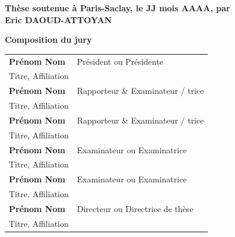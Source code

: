\documentclass[12pt, a4paper]{book}
\begin{document}
\begin{titlepage}
\textbf{Thèse soutenue à Paris-Saclay, le JJ mois AAAA, par}\\
\bigskip
\Large {\color{Prune} \textbf{Eric DAOUD-ATTOYAN}} %

\vspace{\fill} %

\bigskip

\flushleft
\small \textbf{Composition du jury}\\
\vspace{2mm}
\scriptsize
\begin{tabular}{|p{7cm}l}
\arrayrulecolor{Prune}
\textbf{Prénom Nom} &   Président ou Présidente\\
Titre, Affiliation & \\
\textbf{Prénom Nom} &  Rapporteur \& Examinateur / trice \\
Titre, Affiliation   &   \\
\textbf{Prénom Nom} &  Rapporteur \& Examinateur / trice \\
Titre, Affiliation  &   \\
\textbf{Prénom Nom} &  Examinateur ou Examinatrice \\
Titre, Affiliation   &   \\
\textbf{Prénom Nom} &  Examinateur ou Examinatrice \\
Titre, Affiliation   &   \\
\textbf{Prénom Nom} &  Directeur ou Directrice de thèse \\
Titre, Affiliation   &   \\

\end{tabular}

\end{titlepage}


\tableofcontents





\begin{singlespace}










\end{singlespace}
\end{document}
